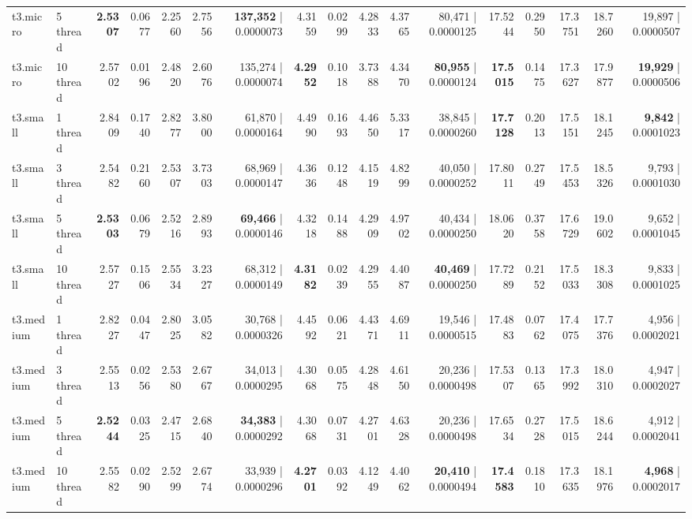 \documentclass[conference]{IEEEtran}
\begin{document}
\begin{table}[h]
{\begin{tabular}{ll|rrrrr|rrrrr|rrrrr}
				t3.micro & 5 thread & \textbf{2.5307} & 0.0677 & 2.2560 & 2.7556 & \textbf{137,352} | 0.0000073 & 4.3159 & 0.0299 & 4.2833 & 4.3765 & 80,471 | 0.0000125 & 17.5244 & 0.2950 & 17.3751 & 18.7260 & 19,897 | 0.0000507 \\
				t3.micro & 10 thread & 2.5702 & 0.0196 & 2.4820 & 2.6076 & 135,274 | 0.0000074 & \textbf{4.2952} & 0.1018 & 3.7388 & 4.3470 & \textbf{80,955} | 0.0000124 & \textbf{17.5015} & 0.1475 & 17.3627 & 17.9877 & \textbf{19,929} | 0.0000506 \\
				\midrule
				t3.small & 1 thread & 2.8409 & 0.1740 & 2.8277 & 3.8000 & 61,870 | 0.0000164 & 4.4990 & 0.1693 & 4.4650 & 5.3317 & 38,845 | 0.0000260 & \textbf{17.7128} & 0.2013 & 17.5151 & 18.1245 & \textbf{9,842} | 0.0001023 \\
				t3.small & 3 thread & 2.5482 & 0.2160 & 2.5307 & 3.7303 & 68,969 | 0.0000147 & 4.3636 & 0.1248 & 4.1519 & 4.8299 & 40,050 | 0.0000252 & 17.8011 & 0.2749 & 17.5453 & 18.5326 & 9,793 | 0.0001030 \\
				t3.small & 5 thread & \textbf{2.5303} & 0.0679 & 2.5216 & 2.8993 & \textbf{69,466} | 0.0000146 & 4.3218 & 0.1488 & 4.2909 & 4.9702 & 40,434 | 0.0000250 & 18.0620 & 0.3758 & 17.6729 & 19.0602 & 9,652 | 0.0001045 \\
				t3.small & 10 thread & 2.5727 & 0.1506 & 2.5534 & 3.2327 & 68,312 | 0.0000149 & \textbf{4.3182} & 0.0239 & 4.2955 & 4.4087 & \textbf{40,469} | 0.0000250 & 17.7289 & 0.2152 & 17.5033 & 18.3308 & 9,833 | 0.0001025 \\
				\midrule
				t3.medium & 1 thread & 2.8227 & 0.0447 & 2.8025 & 3.0582 & 30,768 | 0.0000326 & 4.4592 & 0.0621 & 4.4371 & 4.6911 & 19,546 | 0.0000515 & 17.4883 & 0.0762 & 17.4075 & 17.7376 & 4,956 | 0.0002021 \\
				t3.medium & 3 thread & 2.5513 & 0.0256 & 2.5380 & 2.6767 & 34,013 | 0.0000295 & 4.3068 & 0.0575 & 4.2848 & 4.6150 & 20,236 | 0.0000498 & 17.5307 & 0.1365 & 17.3992 & 18.0310 & 4,947 | 0.0002027 \\
				t3.medium & 5 thread & \textbf{2.5244} & 0.0325 & 2.4715 & 2.6840 & \textbf{34,383} | 0.0000292 & 4.3068 & 0.0731 & 4.2701 & 4.6328 & 20,236 | 0.0000498 & 17.6534 & 0.2728 & 17.5015 & 18.6244 & 4,912 | 0.0002041 \\
				t3.medium & 10 thread & 2.5582 & 0.0290 & 2.5299 & 2.6774 & 33,939 | 0.0000296 & \textbf{4.2701} & 0.0392 & 4.1249 & 4.4062 & \textbf{20,410} | 0.0000494 & \textbf{17.4583} & 0.1810 & 17.3635 & 18.1976 & \textbf{4,968} | 0.0002017 \\
				\midrule

\end{tabular}}
\end{table}
\end{document}
